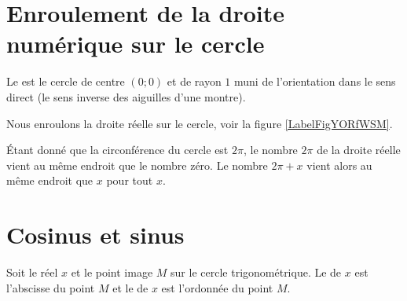 
\section{Enroulement de la droite numérique sur le cercle}



\begin{definition}
    Le  est le cercle de centre \( (0;0)\) et de rayon \( 1\) muni de l'orientation dans le sens direct (le sens inverse des aiguilles d'une montre).
\end{definition}

Nous enroulons la droite réelle sur le cercle, voir la figure \ref{LabelFigYORfWSM}. %
\newcommand{\CaptionFigYORfWSM}{Un cercle trigonométrique avec enroulement de la droite rélle.}


Étant donné que la circonférence du cercle est \( 2\pi\), le nombre \( 2\pi\) de la droite réelle vient au même endroit que le nombre zéro. Le nombre \( 2\pi+x\) vient alors au même endroit que \( x\) pour tout \( x\).

\section{Cosinus et sinus}

\begin{minipage}{0.485\textwidth}
\begin{definition}
    Soit le réel \( x\) et le point image \( M\) sur le cercle trigonométrique. Le  de \( x\) est l'abscisse du point \( M\) et le  de \(x\) est l'ordonnée du point \( M\).
\end{definition}
\end{minipage}
\hspace{1mm}
\begin{minipage}{6cm}
    \begin{center}
   
    \end{center}
\end{minipage}

